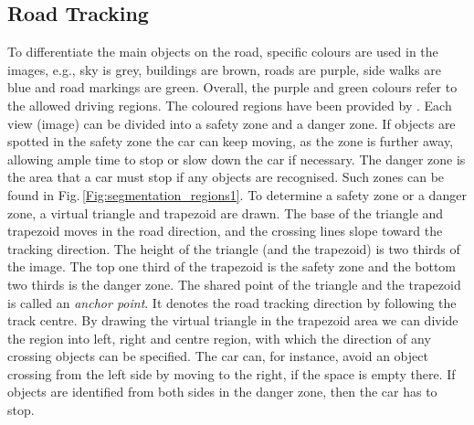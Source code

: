 \documentclass{svproc}
\begin{document}
	\subsection{Road Tracking}
	To differentiate the main objects on the road, specific colours are used in the images, e.g., sky is grey, buildings are brown, roads are purple, side walks are blue and road markings are green. Overall, the purple and green colours refer to the allowed driving regions. The coloured regions have been provided by \cite{Ros2016TheSYNTHIA}.	Each view (image) can be divided into a safety zone and a danger zone. If objects are spotted in the safety zone the car can keep moving, as the zone is further away, allowing ample time to stop or slow down the car if necessary. The danger zone is the area that a car must stop if any objects are recognised. Such zones can be found in Fig.\,\ref{Fig:segmentation_regions1}. 
	To determine a safety zone or a danger zone, a virtual triangle and trapezoid are drawn. The base of the triangle and trapezoid moves in the road direction, and the crossing lines slope toward the tracking direction. The height of the triangle (and the trapezoid) is two thirds of the image. The top one third of the trapezoid is the safety zone and the bottom two thirds is the danger zone. The shared point of the triangle and the trapezoid is called an \emph{anchor point}. It denotes the road tracking direction by following the track centre. By drawing the virtual triangle in the trapezoid area we can divide the region into left, right and centre region, with which the direction of any crossing objects can be specified. The car can, for instance, avoid an object crossing from the left side by moving to the right, if the space is empty there. If objects are identified from both sides in the danger zone, then the car has to stop.  
\end{document}
